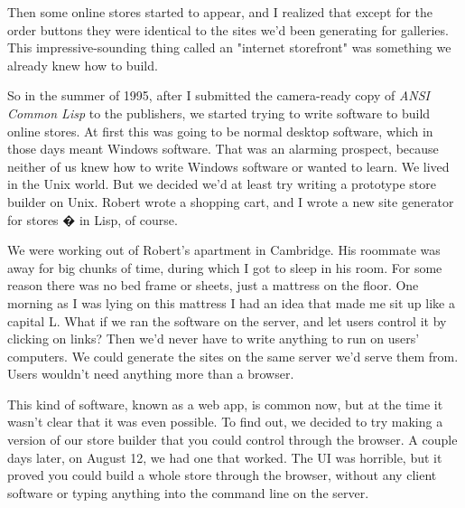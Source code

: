 Then some online stores started to
                  appear, and I realized that except for the order buttons they
                  were identical to the sites we'd been generating for
                  galleries. This impressive-sounding thing called an "internet
                  storefront" was something we already knew how to build.

So
                  in the summer of 1995, after I submitted the camera-ready copy
                  of \emph{ANSI Common Lisp} to the publishers, we started
                  trying to write software to build online stores. At first this
                  was going to be normal desktop software, which in those days
                  meant Windows software. That was an alarming prospect, because
                  neither of us knew how to write Windows software or wanted to
                  learn. We lived in the Unix world. But we decided we'd at
                  least try writing a prototype store builder on Unix. Robert
                  wrote a shopping cart, and I wrote a new site generator for
                  stores � in Lisp, of course.

We were working out of
                  Robert's apartment in Cambridge. His roommate was away for big
                  chunks of time, during which I got to sleep in his room. For
                  some reason there was no bed frame or sheets, just a mattress
                  on the floor. One morning as I was lying on this mattress I
                  had an idea that made me sit up like a capital L. What if we
                  ran the software on the server, and let users control it by
                  clicking on links? Then we'd never have to write anything to
                  run on users' computers. We could generate the sites on the
                  same server we'd serve them from. Users wouldn't need anything
                  more than a browser.

This kind of software, known
                  as a web app, is common now, but at the time it wasn't clear
                  that it was even possible. To find out, we decided to try
                  making a version of our store builder that you could control
                  through the browser. A couple days later, on August 12, we had
                  one that worked. The UI was horrible, but it proved you could
                  build a whole store through the browser, without any client
                  software or typing anything into the command line on the
                  server.

